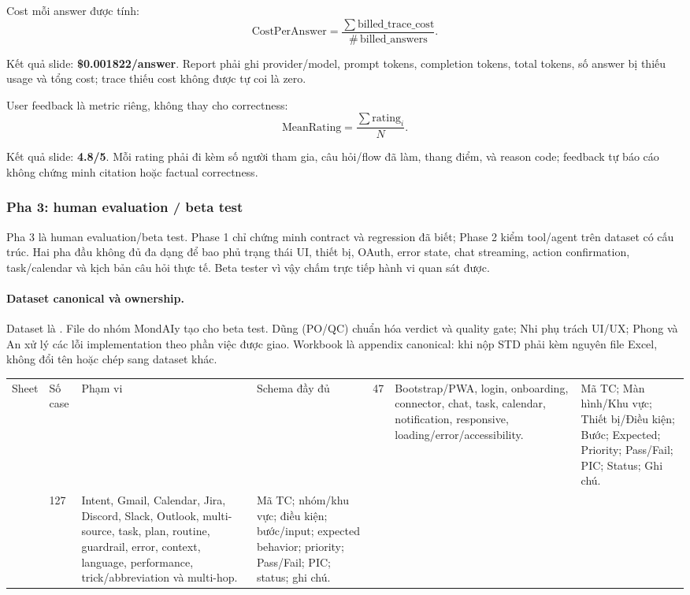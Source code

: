 \documentclass[12pt,a4paper]{article}
\begin{document}
Cost mỗi answer được tính:
\[
\mathrm{CostPerAnswer}=\frac{\sum\mathrm{billed\_trace\_cost}}
{\#\,\mathrm{billed\_answers}}.
\]

Kết quả slide: \textbf{\$0.001822/answer}. Report phải ghi provider/model,
prompt tokens, completion tokens, total tokens, số answer bị thiếu usage và
tổng cost; trace thiếu cost không được tự coi là zero.

User feedback là metric riêng, không thay cho correctness: 
\[
\mathrm{MeanRating}=\frac{\sum\mathrm{rating}_i}{N}.
\]

Kết quả slide: \textbf{4.8/5}. Mỗi rating phải đi kèm số người tham gia, câu
hỏi/flow đã làm, thang điểm, và reason code; feedback tự báo cáo không chứng
minh citation hoặc factual correctness.

\subsubsection{Pha 3: human evaluation / beta test}
Pha 3 là human evaluation/beta test. Phase 1 chỉ chứng minh contract và
regression đã biết; Phase 2 kiểm tool/agent trên dataset có cấu trúc. Hai pha
đầu không đủ đa dạng để bao phủ trạng thái UI, thiết bị, OAuth, error state,
chat streaming, action confirmation, task/calendar và kịch bản câu hỏi thực tế.
Beta tester vì vậy chấm trực tiếp hành vi quan sát được.

\paragraph{Dataset canonical và ownership.} Dataset là
. File do nhóm
MondAIy tạo cho beta test. Dũng (PO/QC) chuẩn hóa verdict và quality gate; Nhi
phụ trách UI/UX; Phong và An xử lý các lỗi implementation theo phần việc được
giao. Workbook là appendix canonical: khi nộp STD phải kèm nguyên file Excel,
không đổi tên hoặc chép sang dataset khác.

\begin{longtable}{p{3.7cm}p{2.2cm}p{4.2cm}p{3.7cm}}
\toprule Sheet & Số case & Phạm vi & Schema đầy đủ \ \midrule
\endhead
{} & 47 & Bootstrap/PWA, login, onboarding, connector,
chat, task, calendar, notification, responsive, loading/error/accessibility. &
Mã TC; Màn hình/Khu vực; Thiết bị/Điều kiện; Bước; Expected; Priority;
Pass/Fail; PIC; Status; Ghi chú. \\
 & 127 & Intent, Gmail, Calendar, Jira,
Discord, Slack, Outlook, multi-source, task, plan, routine, guardrail, error,
context, language, performance, trick/abbreviation và multi-hop. &
Mã TC; nhóm/khu vực; điều kiện; bước/input; expected behavior; priority;
Pass/Fail; PIC; status; ghi chú. \\
\bottomrule
\end{longtable}
\end{document}
